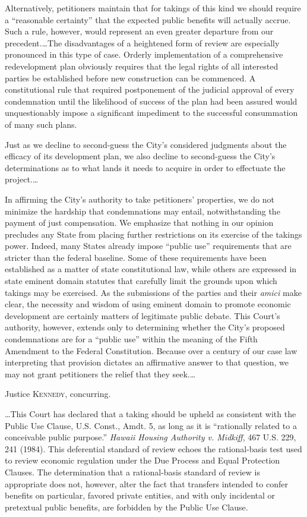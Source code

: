 Alternatively, petitioners maintain that for takings of this kind we should
require a ``reasonable certainty'' that the expected public benefits will
actually accrue. Such a rule, however, would represent an even greater departure
from our precedent.\ldots The disadvantages of a heightened form of review are
especially pronounced in this type of case. Orderly implementation of a
comprehensive redevelopment plan obviously requires that the legal rights of all
interested parties be established before new construction can be commenced. A
constitutional rule that required postponement of the judicial approval of every
condemnation until the likelihood of success of the plan had been assured would
unquestionably impose a significant impediment to the successful consummation of
many such plans.

Just as we decline to second-guess the City's considered judgments about the
efficacy of its development plan, we also decline to second-guess the City's
determinations as to what lands it needs to acquire in order to effectuate the
project.\ldots

In affirming the City's authority to take petitioners' properties, we do not
minimize the hardship that condemnations may entail, notwithstanding the payment
of just compensation. We emphasize that nothing in our opinion precludes any
State from placing further restrictions on its exercise of the takings power.
Indeed, many States already impose ``public use'' requirements that are stricter
than the federal baseline. Some of these requirements have been established as a
matter of state constitutional law, while others are expressed in state eminent
domain statutes that carefully limit the grounds upon which takings may be
exercised. As the submissions of the parties and their \textit{amici} make
clear, the necessity and wisdom of using eminent domain to promote economic
development are certainly matters of legitimate public debate. This Court's
authority, however, extends only to determining whether the City's proposed
condemnations are for a ``public use'' within the meaning of the Fifth Amendment
to the Federal Constitution. Because over a century of our case law interpreting
that provision dictates an affirmative answer to that question, we may not grant
petitioners the relief that they seek.\ldots

\opinion Justice \textsc{Kennedy}, concurring.

\ldots This Court has declared that a taking should be upheld as consistent with
the Public Use Clause, U.S. Const., Amdt. 5, as long as it is ``rationally
related to a conceivable public purpose.'' \textit{Hawaii Housing Authority v.
Midkiff}, 467 U.S. 229, 241 (1984). This deferential standard of review echoes
the rational-basis test used to review economic regulation under the Due Process
and Equal Protection Clauses. The determination that a rational-basis standard
of review is appropriate does not, however, alter the fact that transfers
intended to confer benefits on particular, favored private entities, and with
only incidental or pretextual public benefits, are forbidden by the Public Use
Clause.

